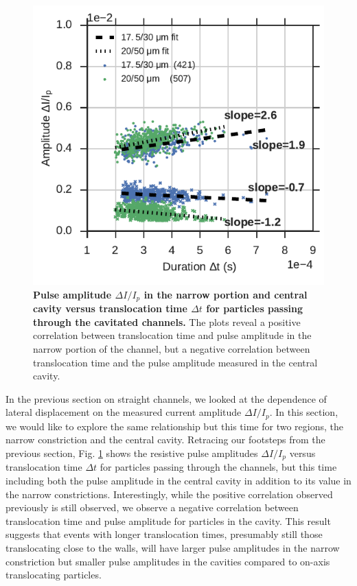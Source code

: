 			\begin{figure}
				\includegraphics[width=\textwidth]{dIdtcavity.pdf}
				\caption{\textbf{Pulse amplitude $\Delta I/I_{p}$ in the narrow portion and central cavity versus translocation time $\Delta t$ for particles passing through the cavitated channels.} The plots reveal a positive correlation between translocation time and pulse amplitude in the narrow portion of the channel, but a negative correlation between translocation time and the pulse amplitude measured in the central cavity.}
				\label{fig:dIdtcavity}
			\end{figure}

		    
		    
		    
			In the previous section on straight channels, we looked at the dependence of lateral displacement on the measured current amplitude $\Delta I/I_{p}$. In this section, we would like to explore the same relationship but this time for two regions, the narrow constriction and the central cavity. Retracing our footsteps from the previous section, Fig. \ref{fig:dIdtcavity} shows the resistive pulse amplitudes $\Delta I/I_{p}$ versus translocation time $\Delta t$ for particles passing through the channels, but this time including both the pulse amplitude in the central cavity in addition to its value in the narrow constrictions. Interestingly, while the positive correlation observed previously is still observed, we observe a negative correlation between translocation time and pulse amplitude for particles in the cavity. This result suggests that events with longer translocation times, presumably still those translocating close to the walls, will have larger pulse amplitudes in the narrow constriction but smaller pulse amplitudes in the cavities compared to on-axis translocating particles.
			

